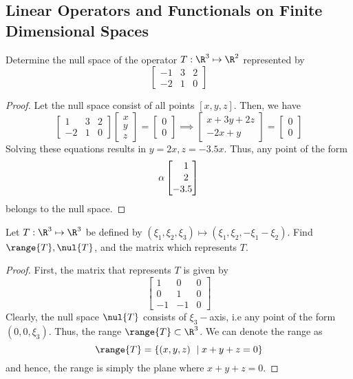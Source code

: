 \subsection{Linear Operators and Functionals on Finite Dimensional Spaces}

\begin{question}
    Determine the null space of the operator $T : \R^3 \mapsto \R^2$ represented by
    \[\begin{bmatrix}
        -1 & 3 & 2\\-2 & 1 & 0
    \end{bmatrix}\]
\label{section2.9-1}
\end{question}
\begin{proof}
    Let the null space consist of all points $[x,y , z]$. Then, we have
    \[\begin{bmatrix}
        1 & 3 & 2\\-2 & 1 & 0
    \end{bmatrix}
    \begin{bmatrix}
        x\\y\\z
    \end{bmatrix} = 
    \begin{bmatrix}
        0 \\ 0
    \end{bmatrix} \implies 
    \begin{bmatrix}
        x + 3y + 2z  \\ -2x + y 
    \end{bmatrix} = 
    \begin{bmatrix}
        0\\0
    \end{bmatrix}\]
    Solving these equations results in $y = 2x , z = -3.5x$. Thus, any point of the form
    \[\alpha \begin{bmatrix}
        \hphantom{-}1 \\ \hphantom{-}2 \\ -3.5
    \end{bmatrix}\]
    belongs to the null space.
\end{proof}

\begin{question}
    Let $T : \R^3 \mapsto \R^3$ be defined by $(\xi_1 , \xi_2 , \xi_3) \mapsto (\xi_1 , \xi_2 , -\xi_1 - \xi_2)$. Find $\range{T}, \nul{T}$, and the matrix which represents $T$.
    \label{section2.9-2}
\end{question}
\begin{proof}
    First, the matrix that represents $T$ is given by
    \[\begin{bmatrix}
        1 & 0 & 0\\0 & 1 & 0\\-1 & -1 & 0
    \end{bmatrix}\]
    Clearly, the null space $\nul{T}$ consists of $\xi_3-$axis, i.e any point of the form $(0,0,\xi_3)$. Thus, the range $\range{T} \subset \R^3$. We can denote the range as
    \[\range{T} = \{(x,y,z)\ \mid x + y + z = 0\}\]
    and hence, the range is simply the plane where $x + y + z = 0$.
\end{proof}

